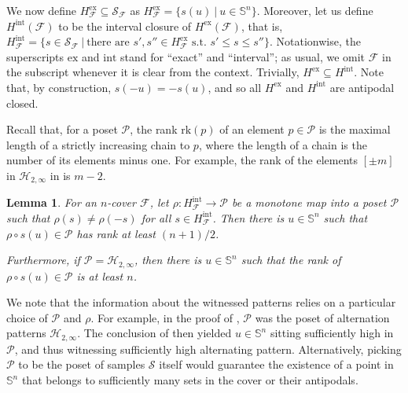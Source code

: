 \documentclass{article} %
\newcommand{\F}{\mathcal{F}}
\renewcommand{\H}{\mathcal{H}}
\renewcommand{\S}{\mathcal{S}}
\renewcommand{\SS}{\mathbb{S}}
\newcommand{\PP}{\mathcal{P}}
\newcommand{\intr}{\mathrm{int}}
\newcommand{\ex}{\mathrm{ex}}
\newcommand{\rk}{\mathrm{rk}}
\newtheorem{lemma}{Lemma}
\begin{document}
We now define $H^\ex_\F\subseteq \S_\F$ as $H^\ex_\F = \{s(u)~|~u\in \SS^n\}$. Moreover, let us define $H^\intr(\F)$ to be the interval closure of $H^\ex(\F)$, that is, $H^\intr_\F = \{s\in \S_\F~|~\text{there are } s', s''\in H^\ex_\F \text{ s.t. } s'\leq s\leq s''\}$. Notationwise, the superscripts $\ex$ and $\intr$ stand for ``exact'' and ``interval''; as usual, we omit $\F$ in the subscript whenever it is clear from the context. Trivially, $H^\ex \subseteq H^\intr$. Note that, by construction, $s(-u) = -s(u)$, and so all $H^\ex$ and $H^\intr$ are antipodal closed.

Recall that, for a poset $\PP$, the rank $\rk(p)$ of an element $p\in \PP$ is the maximal length of a strictly increasing chain to $p$, where the length of a chain is the number of its elements minus one. 
For example, the rank of the elements $[\pm m]$ in $\H_{2, \infty}$  in  is $m-2$. 

\begin{lemma}\label{lem-Ky-Fan-generalized}
	For an $n$-cover $\F$, let $\rho\colon H^\intr_\F\rightarrow \PP$ be a monotone map into a poset $\PP$ such that $\rho(s) \neq \rho(-s)$ for all $s\in H^\intr_\F$. Then there is $u\in \SS^n$ such that $\rho\circ s(u)\in \PP$ has rank at least $(n + 1)/2$. %
	
	Furthermore, if $\PP = \H_{2, \infty}$, then there is $u\in \SS^n$ such that the rank of $\rho\circ s(u)\in \PP$ is at least $n$.
\end{lemma}
We note that the information about the witnessed patterns relies on a particular choice of $\PP$ and $\rho$. For example, in the proof of , $\PP$ was the poset of alternation patterns $\H_{2, \infty}$. The conclusion of  then yielded $u\in \SS^n$ sitting sufficiently high in $\PP$, and thus witnessing sufficiently high alternating pattern. Alternatively, picking $\PP$ to be the poset of samples $\S$ itself would guarantee the existence of a point in $\SS^n$ that belongs to sufficiently many sets in the cover or their antipodals.
\end{document}
